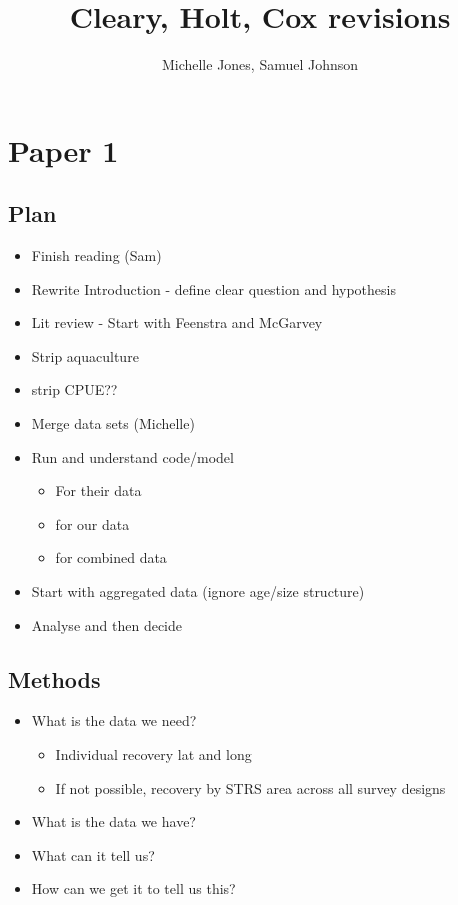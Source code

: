 \documentclass[12pt]{article}
\title{Cleary, Holt, Cox revisions}
\author{Michelle Jones, Samuel Johnson}
\begin{document}
\section*{Paper 1}

\subsection*{Plan}

\begin{itemize}
  \item Finish reading (Sam)
  \item Rewrite Introduction - define clear question and hypothesis
  \item Lit review - Start with Feenstra and McGarvey
  \item Strip aquaculture
  \item strip CPUE??
  \item Merge data sets (Michelle)
  \item Run and understand code/model
    \begin{itemize}
      \item For their data
      \item for our data
      \item for combined data
    \end{itemize}
  \item Start with aggregated data (ignore age/size structure)
  \item Analyse and then decide

\end{itemize}

\subsection*{Methods}
\begin{itemize}
  \item What is the data we need?
    \begin{itemize}
      \item Individual recovery lat and long
      \item If not possible, recovery by STRS area across all survey designs
    \end{itemize}
  \item What is the data we have?
  \item What can it tell us?
  \item How can we get it to tell us this?
\end{itemize}
\end{document}

